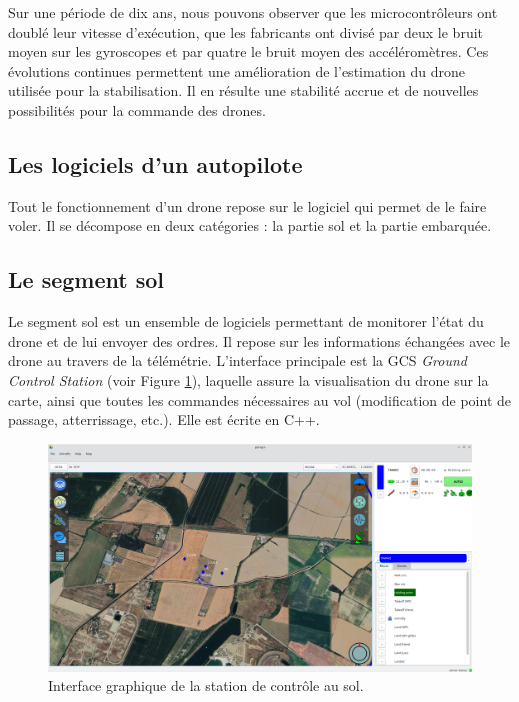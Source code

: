 Sur une période de dix ans, nous pouvons observer que les microcontrôleurs ont doublé leur vitesse d'exécution, que les fabricants ont divisé par deux le bruit moyen sur les gyroscopes et par quatre le bruit moyen des accéléromètres.
Ces évolutions continues permettent une amélioration de l'estimation du drone utilisée pour la stabilisation. Il en résulte une stabilité accrue et de nouvelles possibilités pour la commande des drones.

 \subsection*{Les logiciels d'un autopilote}
 \label{sec:logiciel}
 Tout le fonctionnement d'un drone repose sur le logiciel qui permet de le faire voler. Il se décompose en deux catégories : la partie sol et la partie embarquée.

 \subsection*{Le segment sol}

Le segment sol est un ensemble de logiciels permettant de monitorer l'état du drone et de lui envoyer des ordres. Il repose sur les informations échangées avec le drone au travers de la télémétrie. L'interface principale est la GCS \textit{Ground Control Station} (voir Figure \ref{fig:GCS}), laquelle assure la visualisation du drone sur la carte, ainsi que toutes les commandes nécessaires au vol (modification de point de passage, atterrissage, etc.). Elle est écrite en C++.

\begin{figure}[ht!]
    \centerline{
    \includegraphics[trim=0cm 0cm 0cm 0cm,clip,width=0.8\columnwidth]{figures/GCS.png}}
    \caption{Interface graphique de la station de contrôle au sol.}
    \label{fig:GCS}
\end{figure}


